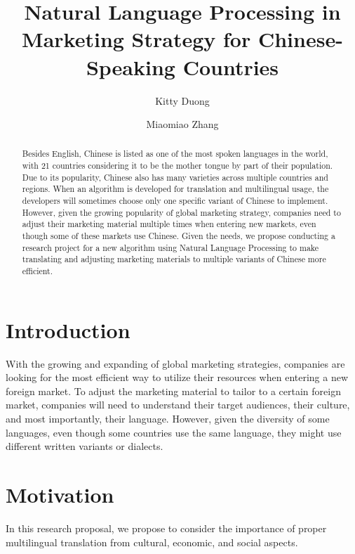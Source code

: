 \documentclass[sigconf]{acmart}
\begin{document}
\title{Natural Language Processing in Marketing Strategy for Chinese-Speaking Countries}
\author{Kitty Duong}

\author{Miaomiao Zhang}

\begin{abstract}
Besides English, Chinese is listed as one of the most spoken languages in the world, with 21 countries considering it to be the mother tongue by part of their population. Due to its popularity, Chinese also has many varieties across multiple countries and regions. When an algorithm is developed for translation and multilingual usage, the developers will sometimes choose only one specific variant of Chinese to implement. However, given the growing popularity of global marketing strategy, companies need to adjust their marketing material multiple times when entering new markets, even though some of these markets use Chinese. Given the needs, we propose conducting a research project for a new algorithm using Natural Language Processing to make translating and adjusting marketing materials to multiple variants of Chinese more efficient.
\end{abstract}
\maketitle

\section{Introduction}
With the growing and expanding of global marketing strategies, companies are looking for the most efficient way to utilize their resources when entering a new foreign market. To adjust the marketing material to tailor to a certain foreign market, companies will need to understand their target audiences, their culture, and most importantly, their language. However, given the diversity of some languages, even though some countries use the same language, they might use different written variants or dialects. 

\section{Motivation}
In this research proposal, we propose to consider the importance of proper multilingual translation from cultural, economic, and social aspects.
\end{document}
